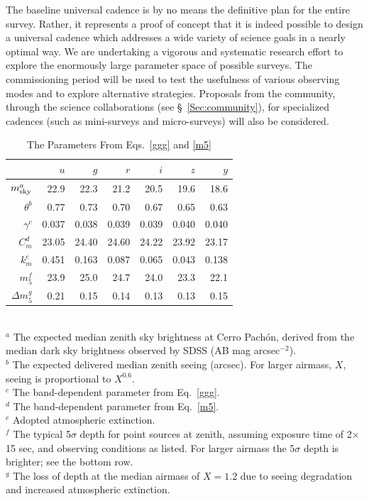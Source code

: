 \documentclass{emulateapj}
\begin{document}
The baseline universal cadence is by no means the definitive plan for the entire
survey. Rather, it represents a proof of concept that it is indeed possible to 
design a universal cadence which addresses a wide variety of science goals in a nearly 
optimal way. We are undertaking a vigorous and systematic research effort to explore 
the enormously large parameter space of possible surveys. The commissioning period 
will be used to test the usefulness of various observing modes and to explore 
alternative strategies. Proposals from the community, through the science collaborations
(see \S~\ref{Sec:community}), for specialized cadences (such as mini-surveys and
micro-surveys) will also be considered.  



\begin{table}
\caption{The Parameters From Eqs.~\ref{ggg} and \ref{m5}}
\begin{tabular}{|r|r|r|r|r|r|r|}
\hline  
              &   $u$  &   $g$   & $r$   &  $i$  & $z$  & $y$  \\
\hline  
   $m_{\rm sky}^a$ &   22.9    & 22.3    & 21.2    & 20.5    & 19.6    &  18.6  \\
   $\theta^b$      &   0.77    & 0.73    & 0.70    & 0.67    &  0.65   &  0.63  \\
  $\gamma^c$       &   0.037   & 0.038   & 0.039   & 0.039   & 0.040   & 0.040 \\
  $C_m^d$        &   23.05   & 24.40   & 24.60   & 24.22   & 23.92   & 23.17 \\
    $k_m^e$       &    0.451   &  0.163   &  0.087   &  0.065   &  0.043   &  0.138 \\
    $m_5^f$        &   23.9    & 25.0    & 24.7    &  24.0   & 23.3    & 22.1  \\
    $\Delta m_5^g$ &   0.21    & 0.15   & 0.14    &  0.13   & 0.13    & 0.15  \\
\hline                         
\end{tabular}
  \\ \vskip 0.05in
  $^a$ The expected median zenith sky brightness at Cerro Pach\'on, derived 
       from the median dark sky brightness observed by SDSS (AB mag arcsec$^{-2}$). \\
  $^b$ The expected delivered median zenith seeing (arcsec). For larger
       airmass, $X$, seeing is proportional to $X^{0.6}$. \\
  $^c$ The band-dependent parameter from Eq.~\ref{ggg}. \\
  $^d$ The band-dependent parameter from Eq.~\ref{m5}. \\
  $^e$ Adopted atmospheric extinction. \\
  $^f$ The typical 5$\sigma$ depth for point sources at zenith, assuming exposure time of 
       2$\times$15 sec, and observing conditions as listed. For larger
       airmass the 5$\sigma$ depth is brighter; see the bottom row. \\
  $^g$ The loss of depth at the median airmass of $X=1.2$ due to seeing degradation 
       and increased atmospheric extinction. \\
\end{table}
\end{document}
